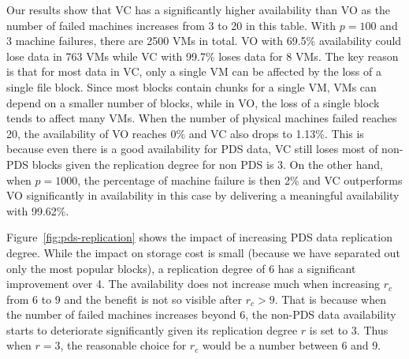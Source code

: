 Our results show that VC has a significantly  higher availability than VO as the number of
failed machines increases from 3 to 20
in this table.
With $p=100$ and 3 machine failures,
there are 2500 VMs in total. VO with 69.5\% availability could lose data in 763 VMs 
while VC with 99.7\% loses data for 8 VMs.
The key reason is that for most data in VC, only a single VM can be affected by
the loss of a single file block. Since most blocks contain chunks for a single
VM, VMs can depend on a smaller number of blocks, while in VO, the loss of a
single block tends to affect many VMs.
When the number of physical machines failed reaches 20, the availability of VO reaches 0\%
and VC also drops to 1.13\%. This is because even there is a good availability for PDS data, VC still
loses most of non-PDS blocks given the replication degree for non PDS is 3.
On the other hand, when $p=1000$, the percentage of machine failure is then 2\% and
 VC outperforms VO significantly in availability in this case by delivering a meaningful availability with 99.62\%.



%
Figure~\ref{fig:pds-replication} shows
the impact of increasing PDS data replication degree. 
While the impact on storage cost is small (because we have separated out only
the most popular blocks),
a replication degree of 6  has a significant improvement over 4. The
availability does not increase much  when increasing
$r_c$ from 6 to 9 and the benefit is not so visible after $r_c>9$. 
That is because when the number of failed machines increases beyond 6, 
the non-PDS data availability starts to deteriorate significantly given its replication degree
$r$ is set to 3. Thus when $r=3$, the reasonable choice for $r_c$ would be a number between 6 and 9.
 
